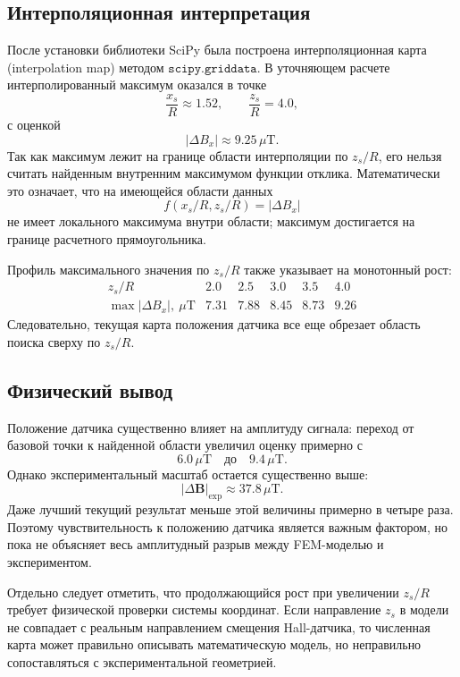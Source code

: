 \documentclass[12pt,a4paper]{article}
\begin{document}
\subsection*{Интерполяционная интерпретация}

После установки библиотеки SciPy была построена интерполяционная карта
(interpolation map) методом \(\texttt{scipy.griddata}\). В уточняющем расчете
интерполированный максимум оказался в точке
\[
    \frac{x_s}{R}\approx 1.52,
    \qquad
    \frac{z_s}{R}=4.0,
\]
с оценкой
\[
    |\Delta B_x|\approx 9.25\,\mu\mathrm{T}.
\]
Так как максимум лежит на границе области интерполяции по \(z_s/R\), его нельзя
считать найденным внутренним максимумом функции отклика. Математически это
означает, что на имеющейся области данных
\[
    f(x_s/R,z_s/R)=|\Delta B_x|
\]
не имеет локального максимума внутри области; максимум достигается на границе
расчетного прямоугольника.

Профиль максимального значения по \(z_s/R\) также указывает на монотонный рост:
\[
\begin{array}{c|ccccc}
z_s/R & 2.0 & 2.5 & 3.0 & 3.5 & 4.0 \\
\hline
\max |\Delta B_x|,\ \mu\mathrm{T}
& 7.31 & 7.88 & 8.45 & 8.73 & 9.26
\end{array}
\]
Следовательно, текущая карта положения датчика все еще обрезает область поиска
сверху по \(z_s/R\).

\subsection*{Физический вывод}

Положение датчика существенно влияет на амплитуду сигнала: переход от базовой
точки к найденной области увеличил оценку примерно с
\[
    6.0\,\mu\mathrm{T}
    \quad \text{до} \quad
    9.4\,\mu\mathrm{T}.
\]
Однако экспериментальный масштаб остается существенно выше:
\[
    |\Delta\mathbf B|_{\mathrm{exp}}\approx 37.8\,\mu\mathrm{T}.
\]
Даже лучший текущий результат меньше этой величины примерно в четыре раза.
Поэтому чувствительность к положению датчика является важным фактором, но пока
не объясняет весь амплитудный разрыв между FEM-моделью и экспериментом.

Отдельно следует отметить, что продолжающийся рост при увеличении \(z_s/R\)
требует физической проверки системы координат. Если направление \(z_s\) в
модели не совпадает с реальным направлением смещения Hall-датчика, то
численная карта может правильно описывать математическую модель, но
неправильно сопоставляться с экспериментальной геометрией.
\end{document}
